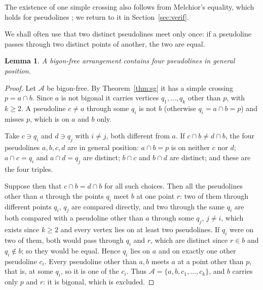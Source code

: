 \documentclass[11pt,a4paper]{amsart}
\newtheorem{lemma}[theorem]{Lemma}
\theoremstyle{definition}
\theoremstyle{remark}
\newcommand{\A}{\mathcal A}
\begin{document}
The existence of one simple crossing also follows from Melchior's equality, which holds for pseudolines \cite[Th.~1.3]{bokowskipokora2017}; we return to it in Section~\ref{sec:verif}.

We shall often use that two distinct pseudolines meet only once: if a pseudoline passes through two distinct points of another, the two are equal.

\begin{lemma}\label{lem:quad}
A bigon-free arrangement contains four pseudolines in general position.
\end{lemma}

\begin{proof}
Let $\A$ be bigon-free. By Theorem~\ref{thm:sg} it has a simple crossing $p = a \cap b$. Since $a$ is not bigonal it carries vertices $q_1, \dots, q_k$ other than $p$, with $k \ge 2$. A pseudoline $c \ne a$ through some $q_i$ is not $b$ (otherwise $q_i = a \cap b = p$) and misses $p$, which is on $a$ and $b$ only.

Take $c \ni q_i$ and $d \ni q_j$ with $i \ne j$, both different from $a$. If $c \cap b \ne d \cap b$, the four pseudolines $a, b, c, d$ are in general position: $a \cap b = p$ is on neither $c$ nor $d$; $a \cap c = q_i$ and $a \cap d = q_j$ are distinct; $b \cap c$ and $b \cap d$ are distinct; and these are the four triples.

Suppose then that $c \cap b = d \cap b$ for all such choices. Then all the pseudolines other than $a$ through the points $q_i$ meet $b$ at one point $r$: two of them through different points $q_i$, $q_j$ are compared directly, and two through the same $q_i$ are both compared with a pseudoline other than $a$ through some $q_j$, $j \ne i$, which exists since $k \ge 2$ and every vertex lies on at least two pseudolines. If $q_i$ were on two of them, both would pass through $q_i$ and $r$, which are distinct since $r \in b$ and $q_i \notin b$; so they would be equal. Hence $q_i$ lies on $a$ and on exactly one other pseudoline $c_i$. Every pseudoline other than $a, b$ meets $a$ at a point other than $p$, that is, at some $q_i$, so it is one of the $c_i$. Thus $\A = \{a, b, c_1, \dots, c_k\}$, and $b$ carries only $p$ and $r$: it is bigonal, which is excluded.
\end{proof}
\end{document}
